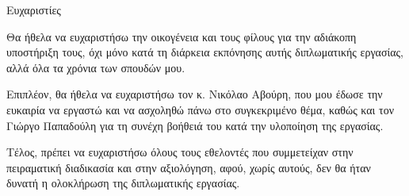 \begin{center}
{\LARGE Ευχαριστίες}\\[1cm]
\end{center}

\setlength\parindent{24pt}Θα ήθελα να ευχαριστήσω την οικογένεια και τους φίλους για την αδιάκοπη υποστήριξη τους, όχι μόνο κατά τη διάρκεια εκπόνησης αυτής διπλωματικής εργασίας, αλλά όλα τα χρόνια των σπουδών μου.

Επιπλέον, θα ήθελα να ευχαριστήσω τον κ. Νικόλαο Αβούρη, που μου έδωσε την ευκαιρία να εργαστώ και να ασχοληθώ πάνω στο συγκεκριμένο θέμα, καθώς και τον Γιώργο Παπαδούλη  για τη συνέχη βοήθειά του κατά την υλοποίηση της εργασίας.

Τέλος, πρέπει να ευχαριστήσω όλους τους εθελοντές που συμμετείχαν στην πειραματική διαδικασία και στην αξιολόγηση, αφού, χωρίς αυτούς, δεν θα ήταν δυνατή η ολοκλήρωση της διπλωματικής εργασίας.